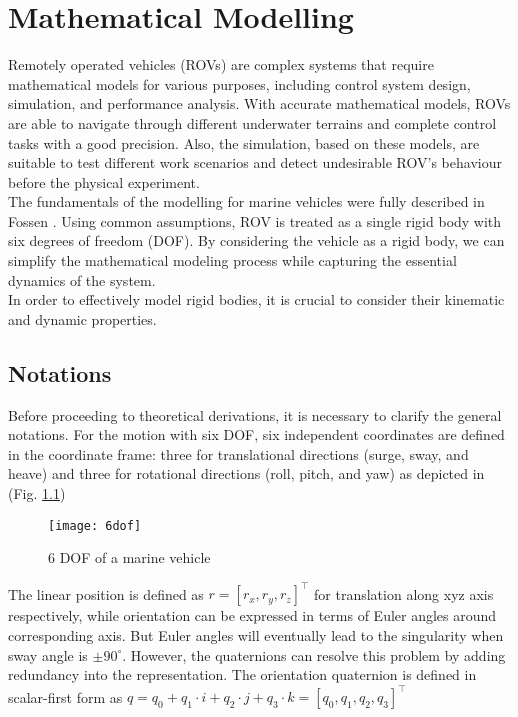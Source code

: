 \chapter{Mathematical Modelling}
\label{chap:mat}



    Remotely operated vehicles (ROVs) are complex systems that require mathematical models for various purposes, 
    including control system design, simulation, and performance analysis. With accurate mathematical models, 
    ROVs are able to navigate through different underwater terrains and complete control tasks with a good 
    precision. Also, the simulation, based on these models, are suitable to test different work scenarios and 
    detect undesirable ROV's behaviour before the physical experiment. \\    
    
    The fundamentals of the modelling for marine vehicles were fully described in Fossen \cite{fossen:guidance}.
    Using common assumptions, ROV is treated as a single rigid body with six degrees of freedom (DOF).
    By considering the vehicle as a rigid body, we can simplify the mathematical modeling process while capturing the essential dynamics 
    of the system. \\

    In order to effectively model rigid bodies, it is crucial to consider their kinematic and dynamic properties.\\

\section{Notations}


    Before proceeding to theoretical derivations, it is necessary to clarify the general notations.
    For the motion with six DOF, six independent coordinates are defined in the coordinate frame: 
    three for translational directions (surge, sway, and heave) and three for rotational directions 
    (roll, pitch, and yaw) as depicted in (Fig. \ref{image:6dof})

    \begin{figure}[H]
        \centering\texttt{[image: 6dof]}
        \caption{6 DOF of a marine vehicle}
        \label{image:6dof}
    \end{figure}

    The linear position is defined as $r = [r_x, r_y, r_z]^\top$ for translation along xyz axis respectively,
    while orientation can be expressed in terms of Euler angles around corresponding axis. 
    But Euler angles will eventually lead to the singularity 
    when sway angle is $± 90^{\circ}$. 
    However, the quaternions can resolve this problem by adding redundancy into the representation. 
    The orientation quaternion is defined in scalar-first form as 
    $q = q_0 + q_1\cdot i + q_2\cdot j + q_3\cdot k = [q_0, q_1, q_2, q_3]^\top$

